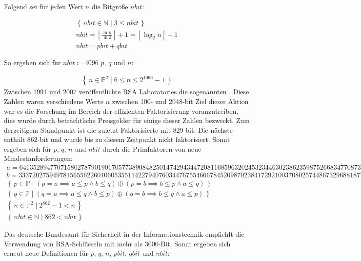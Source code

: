 Folgend sei für jeden Wert $n$ die Bitgröße $nbit$:

\begin{align}
  \left\{\,nbit \in \mathbb{N}\mid 3 \le nbit\, \right\}\\
  nbit=\left\lfloor\frac{\ln{n}}{\ln{2}}\right\rfloor+1=\left\lfloor\log_2{n}\right\rfloor+1\\
  nbit=pbit+qbit
\end{align}

So ergeben sich für $nbit\coloneq4096$ $p$, $q$ und $n$:

\begin{align}
  \left\{\,n \in \mathbb{P}^2\mid 6 \le n \le 2^{4096}-1\, \right\}
\end{align}
\newpage
Zwischen 1991 und 2007 veröffentlichte RSA Laboratories die sogenannten . Diese Zahlen waren verschiedene Werte $n$ zwischen 100- und 2048-bit Ziel dieser Aktion war es die Forschung im Bereich der effizienten Faktorisierung voranzutreiben, dies wurde durch beträchtliche Preisgelder für einige dieser Zahlen bezweckt. Zum derzeitigem Standpunkt ist  die zuletzt Faktorisierte  mit 829-bit\cite{rsa250}. Die nächste   enthält $862$-bit und wurde bis zu diesem Zeitpunkt nicht faktorisiert. Somit ergeben sich für $p$, $q$, $n$ und $nbit$ durch die Primfaktoren von  neue Mindestanforderungen:
\begin{align}
{\scriptscriptstyle a=64135289477071580278790190170577389084825014742943447208116859632024532344630238623598752668347708737661925585694639798853367}\\
{\scriptscriptstyle b=33372027594978156556226010605355114227940760344767554666784520987023841729210037080257448673296881877565718986258036932062711}\\
\left\{\,p \in \mathbb{P}\mid (p=a \implies a \le p \land b \le q) \oplus (p=b \implies b \le p \land a \le q)\, \right\}\\
\left\{\,q \in \mathbb{P}\mid (q=a \implies a \le q \land b \le p) \oplus (q=b \implies b \le q \land a \le p)\, \right\}\\
  \left\{\,n \in \mathbb{P}^2\mid 2^{862}-1 < n\, \right\}\\
\left\{\,nbit \in \mathbb{N}\mid 862 < nbit\, \right\}
\end{align}

Das deutsche Bundesamt für Sicherheit in der Informationstechnik empfiehlt die Verwendung von RSA-Schlüsseln mit mehr als 3000-Bit.\cite{bsicrypto} Somit ergeben sich erneut neue Definitionen für $p$, $q$, $n$, $pbit$, $qbit$ und $nbit$:

